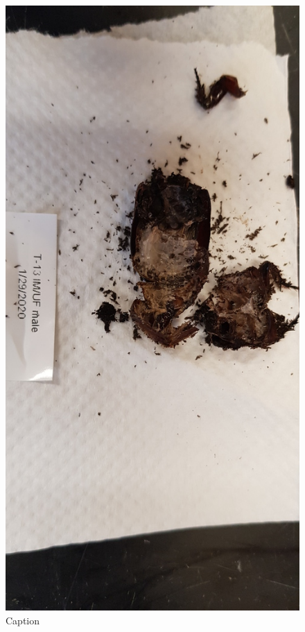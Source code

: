 \begin{figure}[]
\centering
\includegraphics[width=\textwidth]{pm-images/20200129_152333.jpg}
\caption{Caption}
\end{figure}


